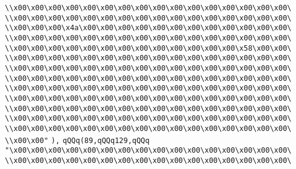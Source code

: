 \verb|\\x00\x00\x00\x00\x00\x00\x00\x00\x00\x00\x00\x00\x00\x00\x00\x00\|\newline
\verb|\\x00\x00\x00\x00\x00\x00\x00\x00\x00\x00\x00\x00\x00\x00\x00\x00\|\newline
\verb|\\x00\x00\x00\x4a\x00\x00\x00\x00\x00\x00\x00\x00\x00\x00\x00\x00\|\newline
\verb|\\x00\x00\x00\x00\x00\x00\x00\x00\x00\x00\x00\x00\x00\x00\x00\x00\|\newline
\verb|\\x00\x00\x00\x00\x00\x00\x00\x00\x00\x00\x00\x00\x00\x58\x00\x00\|\newline
\verb|\\x00\x00\x00\x00\x00\x00\x00\x00\x00\x00\x00\x00\x00\x00\x00\x00\|\newline
\verb|\\x00\x00\x00\x00\x00\x00\x00\x00\x00\x00\x00\x00\x00\x00\x00\x00\|\newline
\verb|\\x00\x00\x00\x00\x00\x00\x00\x00\x00\x00\x00\x00\x00\x00\x00\x00\|\newline
\verb|\\x00\x00\x00\x00\x00\x00\x00\x00\x00\x00\x00\x00\x00\x00\x00\x00\|\newline
\verb|\\x00\x00\x00\x00\x00\x00\x00\x00\x00\x00\x00\x00\x00\x00\x00\x00\|\newline
\verb|\\x00\x00\x00\x00\x00\x00\x00\x00\x00\x00\x00\x00\x00\x00\x00\x00\|\newline
\verb|\\x00\x00\x00\x00\x00\x00\x00\x00\x00\x00\x00\x00\x00\x00\x00\x00\|\newline
\verb|\\x00\x00\x00\x00\x00\x00\x00\x00\x00\x00\x00\x00\x00\x00\x00\x00\|\newline
\verb|\\x00\x00"|\newline
\verb|),|\newline
\verb|qQQq(89,qQQq129,qQQq|\newline
\verb|"\x00\x00\x00\x00\x00\x00\x00\x00\x00\x00\x00\x00\x00\x00\x00\x00\|\newline
\verb|\\x00\x00\x00\x00\x00\x00\x00\x00\x00\x00\x00\x00\x00\x00\x00\x00\|\newline
